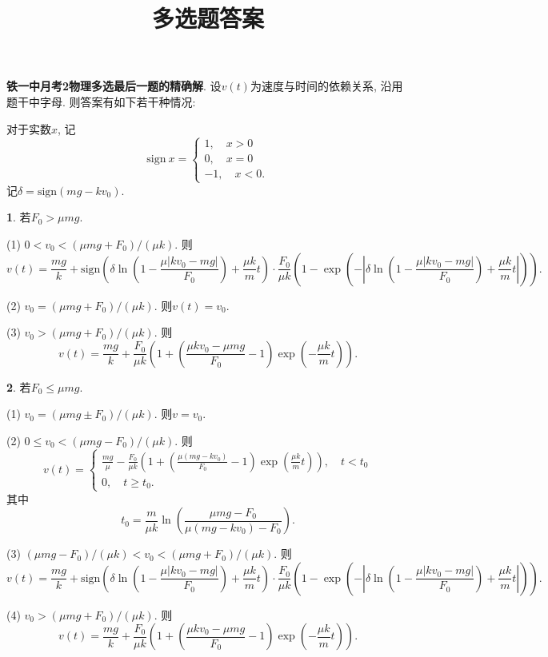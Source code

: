 \documentclass{article}
\title{多选题答案}
\newcommand{\sign}{\mathrm{sign}}
\begin{document}
\textbf{铁一中月考2物理多选最后一题的精确解}. 设$v(t)$为速度与时间的依赖关系, 沿用题干中字母. 则答案有如下若干种情况:\par 
对于实数$x$, 记
\[\sign\ x=\begin{cases}
    1,\quad x>0\\
    0,\quad x=0\\
    -1,\quad x<0.
\end{cases}\]
记$ \delta = \sign(mg-k v_0)$.\par
\textbf{1}. 若$ F_0>\mu m g$.\par
(1) $0<v_0<(\mu m g+F_0)/(\mu k)$. 则
\[v(t)=\frac{mg}{k}+\sign\left(\delta\ln{\left(1-\frac{\mu|k v_0-mg|}{F_0}\right)}+\frac{\mu k}{m }t\right)\cdot \frac{F_0}{\mu k }\left(1-\exp\left(-\left|\delta\ln\left(1-\frac{\mu|k v_0-m g|}{F_0}\right)+\frac{\mu k}{m}t\right|\right)\right).\]\par 
(2) $v_0=(\mu m g+F_0)/(\mu k)$. 则$v(t)=v_0$.\par
(3) $v_0>(\mu m g+F_0)/(\mu k)$. 则
\[v(t)=\frac{mg}{k}+\frac{F_0}{\mu k}\left(1+\left(\frac{\mu k v_0 -\mu mg}{F_0}-1\right)\exp{\left(-\frac{\mu k}{m}t\right)}\right).\]\par 
\textbf{2}. 若$F_0\le \mu m g$.\par 
(1) $v_0=(\mu m g \pm F_0)/(\mu k)$. 则$v=v_0$.\par
(2) $0\le v_0<(\mu m g - F_0)/(\mu k)$. 则
\[v(t)=\begin{cases}
    \displaystyle\frac{mg}{\mu}-\frac{F_0}{\mu k}\left(1+\left(\frac{\mu (m g-k v_0)}{F_0}-1\right)\exp\left(\frac{\mu k}{m}t\right)\right),\quad t<t_0\\
    0,\quad t\ge t_0.
\end{cases}\]
其中
\[t_0=\frac{m}{\mu k}\ln\left(\frac{\mu m g-F_0}{\mu (mg -k v_0)-F_0}\right).\]\par 
(3) $(\mu m g-F_0)/(\mu k)<v_0<(\mu m g+F_0)/(\mu k)$. 则
\[v(t)=\frac{mg}{k}+\sign\left(\delta\ln{\left(1-\frac{\mu|k v_0-mg|}{F_0}\right)}+\frac{\mu k}{m }t\right)\cdot \frac{F_0}{\mu k }\left(1-\exp\left(-\left|\delta\ln\left(1-\frac{\mu|k v_0-m g|}{F_0}\right)+\frac{\mu k}{m}t\right|\right)\right).\]\par 
(4) $v_0>(\mu m g+F_0)/(\mu k)$. 则
\[v(t)=\frac{mg}{k}+\frac{F_0}{\mu k}\left(1+\left(\frac{\mu k v_0 -\mu mg}{F_0}-1\right)\exp{\left(-\frac{\mu k}{m}t\right)}\right).\]
\end{document}
